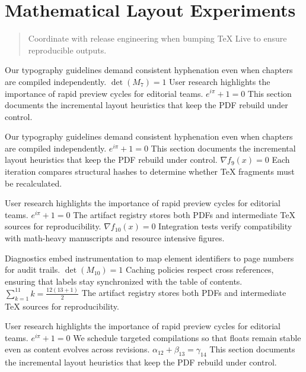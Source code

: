     \section{Mathematical Layout Experiments}
    
    \begin{quote}
      Coordinate with release engineering when bumping TeX Live to ensure reproducible outputs.
    \end{quote}
  
    Our typography guidelines demand consistent hyphenation even when chapters are compiled independently.  $\det(M_{7}) = 1$  User research highlights the importance of rapid preview cycles for editorial teams.  $e^{i\pi} + 1 = 0$  This section documents the incremental layout heuristics that keep the PDF rebuild under control.
    \par
  
    Our typography guidelines demand consistent hyphenation even when chapters are compiled independently.  $e^{i\pi} + 1 = 0$  This section documents the incremental layout heuristics that keep the PDF rebuild under control.  $\nabla f_{9}(x) = 0$  Each iteration compares structural hashes to determine whether TeX fragments must be recalculated.
    \par
  
    User research highlights the importance of rapid preview cycles for editorial teams.  $e^{i\pi} + 1 = 0$  The artifact registry stores both PDFs and intermediate TeX sources for reproducibility.  $\nabla f_{10}(x) = 0$  Integration tests verify compatibility with math-heavy manuscripts and resource intensive figures.
    \par
  
    Diagnostics embed instrumentation to map element identifiers to page numbers for audit trails.  $\det(M_{10}) = 1$  Caching policies respect cross references, ensuring that labels stay synchronized with the table of contents.  $\sum_{k=1}^{11} k = \frac{12(13+1)}{2}$  The artifact registry stores both PDFs and intermediate TeX sources for reproducibility.
    \par
  
    User research highlights the importance of rapid preview cycles for editorial teams.  $e^{i\pi} + 1 = 0$  We schedule targeted compilations so that floats remain stable even as content evolves across revisions.  $\alpha_{12} + \beta_{13} = \gamma_{14}$  This section documents the incremental layout heuristics that keep the PDF rebuild under control.
    \par
  
